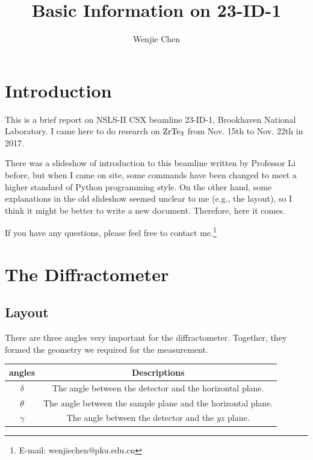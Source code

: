 \documentclass[11pt]{report} %
\title{Basic Information on 23-ID-1}
\author{Wenjie Chen}
\begin{document}
\maketitle

\section{Introduction}

This is a brief report on NSLS-II CSX beamline 23-ID-1, Brookhaven National Laboratory. I came here to do research on $\rm ZrTe_3$ from Nov. 15th to Nov. 22th in 2017. 

There was a slideshow of introduction to this beamline written by Professor Li before, but when I came on site, some commands have been changed to meet a higher standard of Python programming style. On the other hand, some explanations in the old slideshow seemed unclear to me (e.g., the layout), so I think it might be better to write a new document. Therefore, here it comes. 

If you have any questions, please feel free to contact me.\footnote{E-mail: wenjiechen@pku.edu.cn}

\section{The Diffractometer}
\subsection{Layout}
There are three angles very important for the diffractometer. Together, they formed the geometry we required for the measurement.
\begin{center}
\begin{tabular}{|c|c|}\hline
angles & Descriptions\\ \hline
$\delta$ & The angle between the detector and the horizontal plane.\\ \hline
$\theta$ & The angle between the sample plane and the horizontal plane. \\ \hline
$\gamma$ & The angle between the detector and the $yz$ plane. \\ \hline
\end{tabular}
\end{center}
\end{document}
